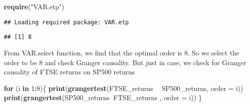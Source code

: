\documentclass[]{article}
\newenvironment{Shaded}{\begin{snugshade}}{\end{snugshade}}
\newcommand{\KeywordTok}[1]{\textcolor[rgb]{0.13,0.29,0.53}{\textbf{#1}}}
\newcommand{\DataTypeTok}[1]{\textcolor[rgb]{0.13,0.29,0.53}{#1}}
\newcommand{\DecValTok}[1]{\textcolor[rgb]{0.00,0.00,0.81}{#1}}
\newcommand{\StringTok}[1]{\textcolor[rgb]{0.31,0.60,0.02}{#1}}
\newcommand{\ControlFlowTok}[1]{\textcolor[rgb]{0.13,0.29,0.53}{\textbf{#1}}}
\newcommand{\OperatorTok}[1]{\textcolor[rgb]{0.81,0.36,0.00}{\textbf{#1}}}
\newcommand{\NormalTok}[1]{#1}
\begin{document}
\begin{Shaded}
\begin{Highlighting}[]
\KeywordTok{require}\NormalTok{(}\StringTok{"VAR.etp"}\NormalTok{)}
\end{Highlighting}
\end{Shaded}

\begin{verbatim}
## Loading required package: VAR.etp
\end{verbatim}

\begin{Shaded}
\end{Shaded}

\begin{verbatim}
## [1] 8
\end{verbatim}

From VAR.select function, we find that the optimal order is 8. So we
select the order to be 8 and check Granger causality. But just in case,
we check for Granger causality of FTSE returns on SP500 returns

\begin{Shaded}
\begin{Highlighting}[]
\ControlFlowTok{for}\NormalTok{ (i }\ControlFlowTok{in} \DecValTok{1}\OperatorTok{:}\DecValTok{8}\NormalTok{)\{}
\KeywordTok{print}\NormalTok{(}\KeywordTok{grangertest}\NormalTok{(FTSE_returns }\OperatorTok{~}\StringTok{ }\NormalTok{SP500_returns, }\DataTypeTok{order =}\NormalTok{ i))}
\KeywordTok{print}\NormalTok{(}\KeywordTok{grangertest}\NormalTok{(SP500_returns}\OperatorTok{~}\NormalTok{FTSE_returns , }\DataTypeTok{order =}\NormalTok{ i))}
\NormalTok{\}}
\end{Highlighting}
\end{Shaded}
\end{document}
